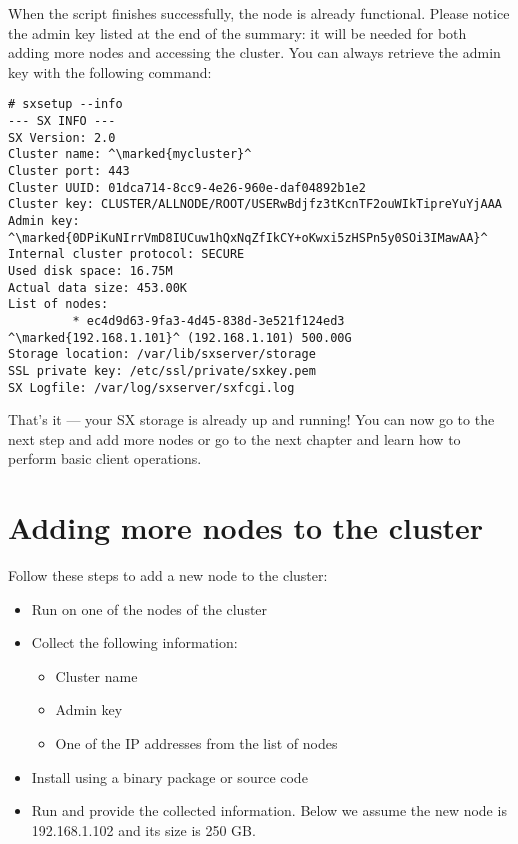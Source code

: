 When the script finishes successfully, the node is already functional.
Please notice the admin key listed at the end of the summary: it will be
needed for both adding more nodes and accessing the cluster. You can
always retrieve the admin key with the following command:
\begin{lstlisting}
# sxsetup --info
--- SX INFO ---
SX Version: 2.0
Cluster name: ^\marked{mycluster}^
Cluster port: 443
Cluster UUID: 01dca714-8cc9-4e26-960e-daf04892b1e2
Cluster key: CLUSTER/ALLNODE/ROOT/USERwBdjfz3tKcnTF2ouWIkTipreYuYjAAA
Admin key: ^\marked{0DPiKuNIrrVmD8IUCuw1hQxNqZfIkCY+oKwxi5zHSPn5y0SOi3IMawAA}^
Internal cluster protocol: SECURE
Used disk space: 16.75M
Actual data size: 453.00K
List of nodes:
         * ec4d9d63-9fa3-4d45-838d-3e521f124ed3 ^\marked{192.168.1.101}^ (192.168.1.101) 500.00G
Storage location: /var/lib/sxserver/storage
SSL private key: /etc/ssl/private/sxkey.pem
SX Logfile: /var/log/sxserver/sxfcgi.log
\end{lstlisting}
That's it --- your SX storage is already up and running! You can now
go to the next step and add more nodes or go to the next chapter and
learn how to perform basic client operations.

\section{Adding more nodes to the cluster} \label{sec:addnode}

Follow these steps to add a new node to the cluster:
\begin{itemize}
    \item Run  on one of the nodes of the cluster
    \item Collect the following information:
	\begin{itemize}
	    \item Cluster name
	    \item Admin key
	    \item One of the IP addresses from the list of nodes
	\end{itemize}
    \item Install \SX using a binary package or source code
    \item Run  and provide the collected information.
	  Below we assume the new node is 192.168.1.102 and its size is 250 GB.
\end{itemize}

